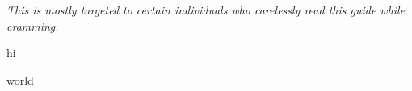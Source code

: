 \documentclass[../main.tex]{subfiles}
\begin{document}
\textit{This is mostly targeted to certain individuals who carelessly read this guide while cramming.}

\enumerate

\item hi

\item world

\endenumerate
\end{document}
